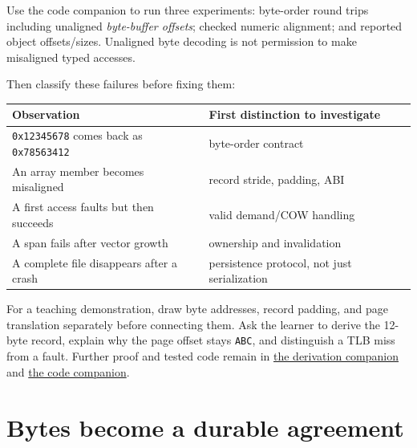 Use the code companion to run three experiments: byte-order round trips including unaligned \emph{byte-buffer offsets}; checked numeric alignment; and reported object offsets/sizes. Unaligned byte decoding is not permission to make misaligned typed accesses.

Then classify these failures before fixing them:

{\def\LTcaptype{none} %
\begin{longtable}[]{@{}
  >{\raggedright\arraybackslash}p{}
  >{\raggedright\arraybackslash}p{}@{}}
\toprule\noalign{}
\begin{minipage}[b]{\linewidth}\raggedright
Observation
\end{minipage} & \begin{minipage}[b]{\linewidth}\raggedright
First distinction to investigate
\end{minipage} \\
\midrule\noalign{}
\endhead
\bottomrule\noalign{}
\endlastfoot
\texttt{0x12345678} comes back as \texttt{0x78563412} & byte-order contract \\
An array member becomes misaligned & record stride, padding, ABI \\
A first access faults but then succeeds & valid demand/COW handling \\
A span fails after vector growth & ownership and invalidation \\
A complete file disappears after a crash & persistence protocol, not just serialization \\
\end{longtable}
}

For a teaching demonstration, draw byte addresses, record padding, and page translation separately before connecting them. Ask the learner to derive the 12-byte record, explain why the page offset stays \texttt{ABC}, and distinguish a TLB miss from a fault. Further proof and tested code remain in \hyperref[01-foundations-i-ch011-m003---byte-order-layout-and-translation]{the derivation companion} and \hyperref[appendix-4e2236f53445-m003---explicit-byte-codecs-and-checked-alignment]{the code companion}.

\section{Bytes become a durable agreement}\label{01-foundations-i-ch002-bytes-become-a-durable-agreement}

